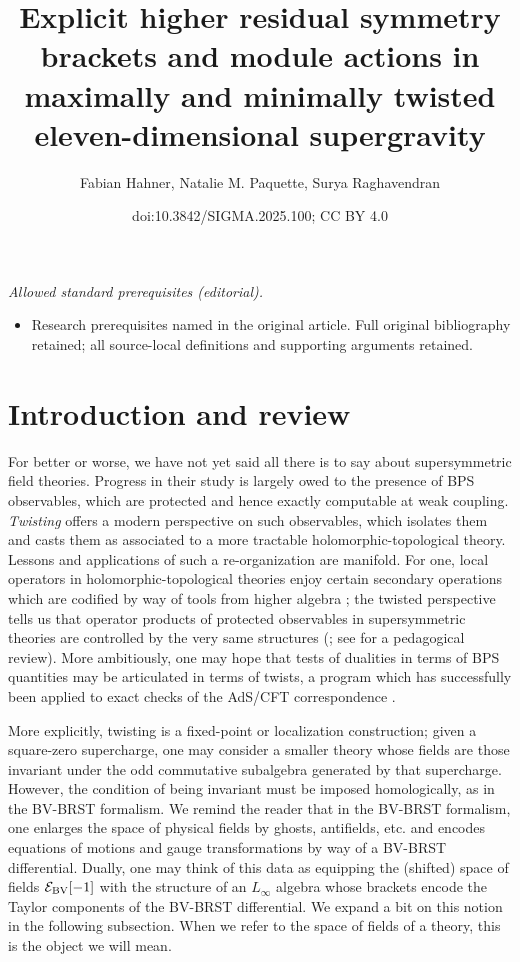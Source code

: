 \documentclass[10pt,a4paper]{amsart}
\title{Explicit higher residual symmetry brackets and module actions in maximally and minimally twisted eleven-dimensional supergravity}
\author{Fabian Hahner, Natalie M. Paquette, Surya Raghavendran}
\date{doi:10.3842/SIGMA.2025.100; CC BY 4.0}
\numberwithin{equation}{section}
\theoremstyle{definition}
\begin{document}
\maketitle
\noindent\textit{Allowed standard prerequisites (editorial).}\begin{itemize}
\item Research prerequisites named in the original article. Full original bibliography retained; all source-local definitions and supporting arguments retained.
\end{itemize}\medskip
\section{Introduction and review} \label{sec: intro}

For better or worse, we have not yet said all there is to say about supersymmetric field theories. Progress in their study is largely owed to the presence of BPS observables, which are protected and hence exactly computable at weak coupling. \textit{Twisting} offers a modern perspective on such observables, which isolates them and casts them as associated to a more tractable holomorphic-topological theory. Lessons and applications of such a re-organization are manifold. For one, local operators in holomorphic-topological theories enjoy certain secondary operations which are codified by way of tools from higher algebra \cite{CG1, CG2, williamswang}; the twisted perspective tells us that operator products of protected observables in supersymmetric theories are controlled by the very same structures (\cite{SecondaryOps,Budzik:2022mpd, sucotwist, ElliottSafronov, Gaiotto:2024gii, Garner:2023wrc, garnerhiggscoulomb}; see \cite{Garner:2022its} for a pedagogical review). More ambitiously, one may hope that tests of dualities in terms of BPS quantities may be articulated in terms of twists, a program which has successfully been applied to exact checks of the AdS/CFT correspondence \cite{CostelloMtheory1, CostelloMtheory2,Costello:2018zrm, Costello:2020jbh}.

More explicitly, twisting is a fixed-point or localization construction; given a square-zero supercharge, one may consider a smaller theory whose fields are those invariant under the odd commutative subalgebra generated by that supercharge. However, the condition of being invariant must be imposed homologically, as in the BV-BRST formalism. We remind the reader that in the BV-BRST formalism, one enlarges the space of physical fields by ghosts, antifields, etc. and encodes equations of motions and gauge transformations by way of a BV-BRST differential. Dually, one may think of this data as equipping the (shifted) space of fields $\mathcal{E}_{\rm BV}[-1]$ with the structure of an $L_\infty$ algebra whose brackets encode the Taylor components of the BV-BRST differential. We expand a bit on this notion in the following subsection. When we refer to the space of fields of a theory, this is the object we will mean.
\end{document}

